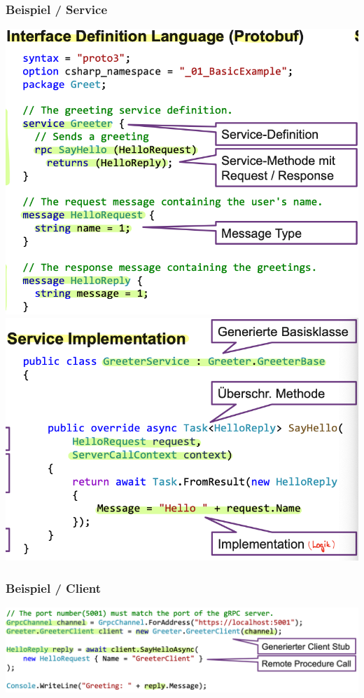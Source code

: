 \subsubsection{Beispiel / Service}
\begin{center}
    \includegraphics[scale=.39]{graphic/gprc/bsp service 1.png}
    \includegraphics[scale=.39]{graphic/gprc/bsp service 2.png}
\end{center}
\vspace{-8pt}
\subsubsection{Beispiel / Client}
\begin{center}
    \includegraphics[scale=.42]{graphic/gprc/bsp service client.png}
\end{center}
\vspace{-8pt}

